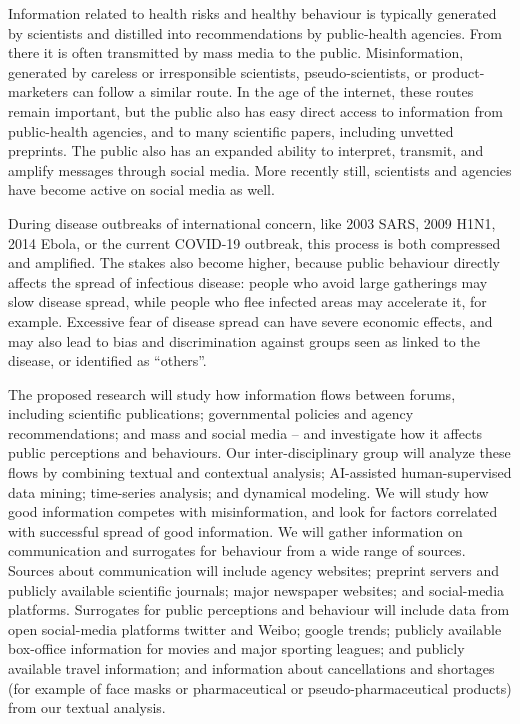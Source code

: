 


Information related to health risks and healthy behaviour is typically generated by scientists and distilled into recommendations by public-health agencies. From there it is often transmitted by mass media to the public. Misinformation, generated by careless or irresponsible scientists, pseudo-scientists, or product-marketers can follow a similar route. In the age of the internet, these routes remain important, but the public also has easy direct access to information from public-health agencies, and to many scientific papers, including unvetted preprints. The public also has an expanded ability to interpret, transmit, and amplify messages through social media. More recently still, scientists and agencies have become active on social media as well.

During disease outbreaks of international concern, like 2003 SARS, 2009 H1N1, 2014 Ebola, or the current COVID-19 outbreak, this process is both compressed and amplified. The stakes also become higher, because public behaviour directly affects the spread of infectious disease: people who avoid large gatherings may slow disease spread, while people who flee infected areas may accelerate it, for example. Excessive fear of disease spread can have severe economic effects, and may also lead to bias and discrimination against groups seen as linked to the disease, or identified as ``others''. 

The proposed research will study how information flows between forums, including scientific publications; governmental policies and agency recommendations; and mass and social media -- and investigate how it affects public perceptions and behaviours. 
Our inter-disciplinary group will analyze these flows by combining textual and contextual analysis; AI-assisted human-supervised data mining; time-series analysis; and dynamical modeling. We will study how good information competes with misinformation, and look for factors correlated with successful spread of good information. 
We will gather information on communication and surrogates for behaviour from a wide range of sources. 
Sources about communication will include agency websites; preprint servers and publicly available scientific journals; major newspaper websites; and social-media platforms. 
Surrogates for public perceptions and behaviour will include data from open social-media platforms twitter and Weibo; google trends; publicly available box-office information for movies and major sporting leagues; and publicly available travel information; and information  about cancellations and shortages (for example of face masks or pharmaceutical or pseudo-pharmaceutical products) from our textual analysis. 


